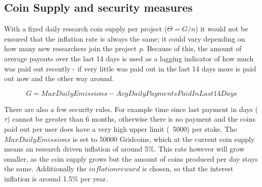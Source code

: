 \subsection{Coin Supply and security measures}

With a fixed daily research coin supply per project ($\Theta = G/n$) it would not be ensured that the inflation rate is always the same; it could vary depending on how many new researchers join the project \textit{p}. Because of this, the amount of average payouts over the last 14 days is used as a lagging indicator of how much was paid out recently - if very little was paid out in the last 14 days more is paid out now and the other way around.

\[ G = MaxDailyEmissions - AvgDailyPaymentsPaidInLast14Days \]

There are also a few security rules. For example time since last payment in days ($\tau$) cannot be greater than 6 months, otherwise there is no payment and the coins paid out per user does have a very high upper limit (~5000) per stake.
The $MaxDailyEmissions$ is set to 50000 Gridcoins, which at the current coin supply means an research driven inflation of around 5\%. This rate however will grow smaller, as the coin supply grows but the amount of coins produced per day stays the same. Additionally the $inflationreward$ is chosen, so that the interest inflation is around 1.5\% per year.
